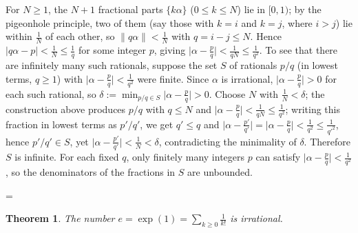 \documentclass[11pt]{article}
\makeatletter
\theoremstyle{ntstyle}
\newtheorem{theorem}{Theorem}[subsection]
\let\nt@closedisplay\]
\def\nt@guardedclose{\@ifnextchar\par{\nt@closeafterpar}{\@ifnextchar\end{\postdisplaypenalty\@M\nt@closedisplay}{\nt@closedisplay}}}
\def\nt@closeafterpar\par{\@ifnextchar\par{\nt@closeafterpar}{\@ifnextchar\end{\postdisplaypenalty\@M\nt@closedisplay\par}{\nt@closedisplay\par}}}
\renewenvironment{proof}[1][\proofname]{\par
  \pushQED{\qed}\normalfont\topsep\medskipamount\edef\nt@afterproof{\@endparpenalty=\the\@endparpenalty\relax}\@beginparpenalty\@M\@endparpenalty\@M\let\]\nt@guardedclose\trivlist\item[]\textit{#1\@addpunct{.}} \ignorespaces}{\ifvmode\addpenalty\@M\fi\popQED\nt@afterproof\endtrivlist\@endpefalse}
\makeatother
\begin{document}
\begin{proof} For $N\ge1$, the $N+1$ fractional parts
	$\{k\alpha\}$ ($0\le k\le N$) lie in $[0,1)$; by the pigeonhole principle, two of
	them (say those with $k=i$ and $k=j$, where $i>j$) lie within $\tfrac{1}{N}$ of each other, so $\lVert q\alpha\rVert <
		\tfrac{1}{N}$ with $q = i-j\le N$. Hence $|q\alpha - p| <
		\tfrac{1}{N}\le\tfrac{1}{q}$ for some integer $p$, giving $\big|\alpha -
		\tfrac{p}{q}\big| < \tfrac{1}{qN}\le\tfrac{1}{q^2}$.
		  To see that there are infinitely many such rationals, suppose the set $S$ of rationals $p/q$ (in lowest terms, $q\ge1$) with $\big|\alpha-\tfrac{p}{q}\big|<\tfrac{1}{q^2}$ were finite.
		  Since $\alpha$ is irrational, $\big|\alpha-\tfrac{p}{q}\big|>0$ for each such rational, so $\delta:=\min_{p/q\in S}\big|\alpha-\tfrac{p}{q}\big|>0$.
		  Choose $N$ with $\tfrac{1}{N}<\delta$; the construction above produces $p/q$ with $q\le N$ and $\big|\alpha-\tfrac{p}{q}\big|<\tfrac{1}{qN}\le\tfrac{1}{q^2}$; writing this fraction in lowest terms as $p'/q'$, we get $q'\le q$ and
	$\big|\alpha-\tfrac{p'}{q'}\big|=\big|\alpha-\tfrac{p}{q}\big|<\tfrac{1}{q^{2}}\le\tfrac{1}{q'^{2}}$,
	hence $p'/q'\in S$, yet
	$\big|\alpha-\tfrac{p'}{q'}\big|<\tfrac{1}{N}<\delta$, contradicting
	the minimality of $\delta$. Therefore $S$ is infinite. For each fixed
	$q$, only finitely many integers $p$ can satisfy
	$\big|\alpha-\tfrac{p}{q}\big|<\tfrac{1}{q^2}$, so the denominators of
	the fractions in $S$ are unbounded.

\end{proof}
\begin{theorem}\label{thm:10.1.2} The number
	$e=\exp(1)=\sum_{k\ge0}\tfrac{1}{k!}$ is irrational.

\end{theorem}
\end{document}
